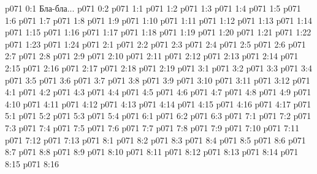 \author{Мелхиседек}
\vs p071 0:1  Бла-бла...
\vs p071 0:2 
\vs p071 1:1 
\vs p071 1:2 
\vs p071 1:3 \pc 
\vs p071 1:4 
\vs p071 1:5 
\vs p071 1:6 
\vs p071 1:7 
\vs p071 1:8 
\vs p071 1:9 
\vs p071 1:10 
\vs p071 1:11 
\vs p071 1:12 \pc 
\vs p071 1:13 \pc 
\vs p071 1:14 
\vs p071 1:15 
\vs p071 1:16 
\vs p071 1:17 
\vs p071 1:18 
\vs p071 1:19 
\vs p071 1:20 
\vs p071 1:21 
\vs p071 1:22 \pc 
\vs p071 1:23 \pc 
\vs p071 1:24 
\vs p071 2:1 
\vs p071 2:2 
\vs p071 2:3 
\vs p071 2:4 
\vs p071 2:5 
\vs p071 2:6 
\vs p071 2:7 \pc 
\vs p071 2:8 
\vs p071 2:9 \pc 
\vs p071 2:10 
\vs p071 2:11 
\vs p071 2:12 
\vs p071 2:13 
\vs p071 2:14 
\vs p071 2:15 
\vs p071 2:16 
\vs p071 2:17 
\vs p071 2:18 
\vs p071 2:19 
\vs p071 3:1 
\vs p071 3:2 
\vs p071 3:3 \pc 
\vs p071 3:4 
\vs p071 3:5 
\vs p071 3:6 
\vs p071 3:7 \pc 
\vs p071 3:8 
\vs p071 3:9 
\vs p071 3:10 
\vs p071 3:11 
\vs p071 3:12 
\vs p071 4:1 
\vs p071 4:2 \pc 
\vs p071 4:3 
\vs p071 4:4 
\vs p071 4:5 
\vs p071 4:6 
\vs p071 4:7 
\vs p071 4:8 
\vs p071 4:9 
\vs p071 4:10 
\vs p071 4:11 
\vs p071 4:12 
\vs p071 4:13 
\vs p071 4:14 
\vs p071 4:15 \pc 
\vs p071 4:16 
\vs p071 4:17 
\vs p071 5:1 
\vs p071 5:2 
\vs p071 5:3 
\vs p071 5:4 
\vs p071 6:1 
\vs p071 6:2 
\vs p071 6:3 
\vs p071 7:1 
\vs p071 7:2 
\vs p071 7:3 
\vs p071 7:4 
\vs p071 7:5 
\vs p071 7:6 
\vs p071 7:7 
\vs p071 7:8 
\vs p071 7:9 
\vs p071 7:10 
\vs p071 7:11 
\vs p071 7:12 
\vs p071 7:13 \pc 
{}
\vs p071 8:1 
\vs p071 8:2 
\vs p071 8:3 
\vs p071 8:4 
\vs p071 8:5 
\vs p071 8:6 
\vs p071 8:7 
\vs p071 8:8 
\vs p071 8:9 
\vs p071 8:10 
\vs p071 8:11 
\vs p071 8:12 
\vs p071 8:13 
\vs p071 8:14 
\vs p071 8:15 \pc 
\vsetoff
\vs p071 8:16 
\quizlink
